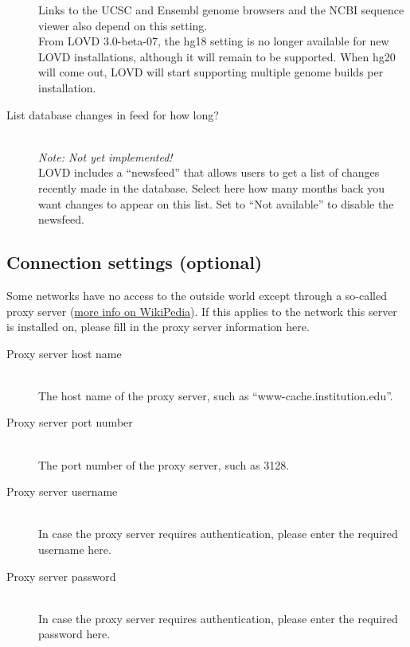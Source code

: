 \documentclass[a4paper,oneside,openany,12pt]{memoir}
\begin{document}
\begin{description}
  Links to the UCSC and Ensembl genome browsers and the NCBI sequence viewer also depend on this setting.
  \\
  From LOVD 3.0-beta-07, the hg18 setting is no longer available for new LOVD installations, although it will remain to be supported.
  When hg20 will come out, LOVD will start supporting multiple genome builds per installation.
  \item[List database changes in feed for how long?] \hfill \\
  \emph{Note: Not yet implemented!}
  \\
  LOVD includes a ``newsfeed'' that allows users to get a list of changes recently made in the database.
  Select here how many months back you want changes to appear on this list.
  Set to ``Not available'' to disable the newsfeed.
\end{description}



\subsection{Connection settings (optional)}
Some networks have no access to the outside world except through a so-called proxy server
 (\href{http://en.wikipedia.org/wiki/Proxy_server#Forward_proxies}{more info on WikiPedia}).
If this applies to the network this server is installed on, please fill in the proxy server information here.
\begin{description}
  \item[Proxy server host name] \hfill \\
  The host name of the proxy server, such as ``www-cache.institution.edu''.
  \item[Proxy server port number] \hfill \\
  The port number of the proxy server, such as 3128.
  \item[Proxy server username] \hfill \\
  In case the proxy server requires authentication, please enter the required username here.
  \item[Proxy server password] \hfill \\
  In case the proxy server requires authentication, please enter the required password here.
\end{description}



\pagebreak[4] %
\end{document}
